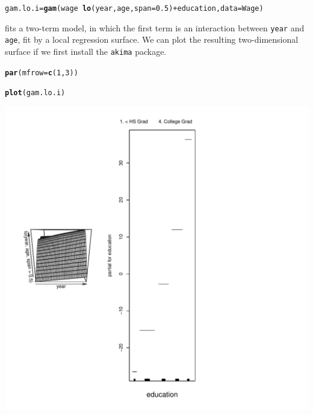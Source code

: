 \documentclass[12pt]{article}\usepackage[]{graphicx}\usepackage[]{color}
\makeatletter
\def\maxwidth{ %
  \ifdim\Gin@nat@width>\linewidth
    \linewidth
  \else
    \Gin@nat@width
  \fi
}
\newcommand{\hlnum}[1]{\textcolor[rgb]{0.686,0.059,0.569}{#1}}%
\newcommand{\hlopt}[1]{\textcolor[rgb]{0,0,0}{#1}}%
\newcommand{\hlstd}[1]{\textcolor[rgb]{0.345,0.345,0.345}{#1}}%
\newcommand{\hlkwb}[1]{\textcolor[rgb]{0.69,0.353,0.396}{#1}}%
\newcommand{\hlkwc}[1]{\textcolor[rgb]{0.333,0.667,0.333}{#1}}%
\newcommand{\hlkwd}[1]{\textcolor[rgb]{0.737,0.353,0.396}{\textbf{#1}}}%
\newenvironment{kframe}{%
 \def\at@end@of@kframe{}%
 \ifinner\ifhmode%
  \def\at@end@of@kframe{\end{minipage}}%
  \begin{minipage}{\columnwidth}%
 \fi\fi%
 \def\FrameCommand##1{\hskip\@totalleftmargin \hskip-\fboxsep
 \colorbox{shadecolor}{##1}\hskip-\fboxsep
     \hskip-\linewidth \hskip-\@totalleftmargin \hskip\columnwidth}%
 \MakeFramed {\advance\hsize-\width
   \@totalleftmargin\z@ \linewidth\hsize
   \@setminipage}}%
 {\par\unskip\endMakeFramed%
 \at@end@of@kframe}
\newenvironment{knitrout}{}{} %
\makeatother
\begin{document}
\begin{knitrout}
\color{fgcolor}\begin{kframe}
\begin{alltt}
\hlstd{gam.lo.i} \hlkwb{=} \hlkwd{gam}\hlstd{(wage}\hlopt{~}\hlkwd{lo}\hlstd{(year, age,} \hlkwc{span}\hlstd{=}\hlnum{0.5}\hlstd{)}\hlopt{+}\hlstd{education,} \hlkwc{data}\hlstd{=Wage)}
\end{alltt}
\end{kframe}
\end{knitrout}

fits a two-term model, in which the first term is an interaction between \texttt{year} and \texttt{age}, fit by a local regression surface. We can plot the resulting two-dimensional surface if we first install the \texttt{akima} package.

\begin{knitrout}
\color{fgcolor}\begin{kframe}
\begin{alltt}
\hlkwd{par}\hlstd{(}\hlkwc{mfrow}\hlstd{=}\hlkwd{c}\hlstd{(}\hlnum{1}\hlstd{,}\hlnum{3}\hlstd{))}

\hlkwd{plot}\hlstd{(gam.lo.i)}
\end{alltt}
\end{kframe}
\includegraphics[width=\maxwidth]{figure/unnamed-chunk-32-1} 

\end{knitrout}
\end{document}
